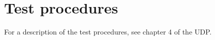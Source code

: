 \chapter{Test procedures}
\label{chap:testProcedures}

For a description of the test procedures, see chapter 4 of the UDP.\\


%
%
%
